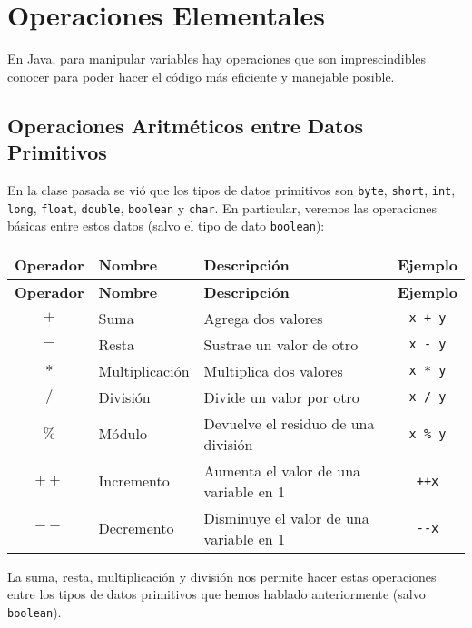 \documentclass[12pt]{article}
\newcounter{it}
\theoremstyle{largebreak}
\begin{document}
    \section{Operaciones Elementales}

    En Java, para manipular variables hay operaciones que son imprescindibles conocer para poder hacer el código más eficiente y manejable posible.

    \subsection{Operaciones Aritméticos entre Datos Primitivos}

    En la clase pasada se vió que los tipos de datos primitivos son \lstinline|byte|, \lstinline|short|, \lstinline|int|, \lstinline|long|, \lstinline|float|, \lstinline|double|, \lstinline|boolean| y \lstinline|char|. En particular, veremos las operaciones básicas entre estos datos (salvo el tipo de dato \lstinline|boolean|):

    \begin{longtable}{c l p{} c}
    \toprule
    \textbf{Operador} & \textbf{Nombre} & \textbf{Descripción} & \textbf{Ejemplo} \\
    \midrule
    \endfirsthead

    \midrule
    \textbf{Operador} & \textbf{Nombre} & \textbf{Descripción} & \textbf{Ejemplo} \\
    \midrule
    \endhead

    \bottomrule
    \endfoot

        $+$ & Suma & Agrega dos valores & \lstinline|x + y| \\
        $-$ & Resta & Sustrae un valor de otro & \lstinline|x - y| \\
        $*$ & Multiplicación & Multiplica dos valores & \lstinline|x * y| \\
        $/$ & División & Divide un valor por otro & \lstinline|x / y| \\
        $\%$ & Módulo & Devuelve el residuo de una división & \lstinline|x % y| \\
        $++$ & Incremento & Aumenta el valor de una variable en 1 & \lstinline|++x| \\
        $--$ & Decremento & Disminuye el valor de una variable en 1 & \lstinline|--x| \\
    \end{longtable}

    La suma, resta, multiplicación y división nos permite hacer estas operaciones entre los tipos de datos primitivos que hemos hablado anteriormente (salvo \lstinline|boolean|).
\end{document}

